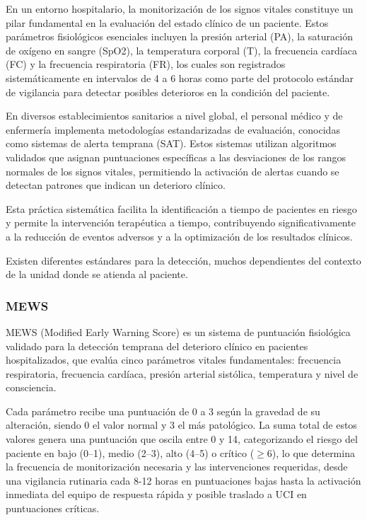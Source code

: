 En un entorno hospitalario, la monitorización de los signos vitales constituye un pilar fundamental en la evaluación del estado clínico de un paciente. 
Estos parámetros fisiológicos esenciales incluyen la presión arterial (PA), la saturación de oxígeno en sangre (SpO2), la temperatura corporal (T), 
la frecuencia cardíaca (FC) y la frecuencia respiratoria (FR), los cuales son registrados sistemáticamente en intervalos de 4 a 6 horas 
como parte del protocolo estándar de vigilancia para detectar posibles deterioros en la condición del paciente.\newline

En diversos establecimientos sanitarios a nivel global, el personal médico y de enfermería implementa metodologías estandarizadas de evaluación, 
conocidas como sistemas de alerta temprana (SAT). 
Estos sistemas utilizan algoritmos validados que asignan puntuaciones específicas a las desviaciones de los rangos normales de los signos vitales, 
permitiendo la activación de alertas cuando se detectan patrones que indican un deterioro clínico. \newline

Esta práctica sistemática facilita la identificación a tiempo de pacientes en riesgo y permite la intervención terapéutica a tiempo, 
contribuyendo significativamente a la reducción de eventos adversos y a la optimización de los resultados clínicos.\newline

Existen diferentes estándares para la detección, muchos dependientes del contexto de la unidad donde se atienda al paciente. \parencite{rpm_pm}

\newpage

\subsubsection{MEWS}
MEWS (Modified Early Warning Score) es un sistema de puntuación fisiológica validado para la detección temprana del deterioro clínico en pacientes hospitalizados, 
que evalúa cinco parámetros vitales fundamentales: frecuencia respiratoria, frecuencia cardíaca, presión arterial sistólica, temperatura 
y nivel de consciencia. \newline

Cada parámetro recibe una puntuación de 0 a 3 según la gravedad de su alteración, siendo 0 el valor normal y 3 el más patológico. 
La suma total de estos valores genera una puntuación que oscila entre 0 y 14, categorizando el riesgo del paciente en bajo (0--1), medio (2--3), alto (4--5) o crítico ($\geq$6), 
lo que determina la frecuencia de monitorización necesaria y las intervenciones requeridas, 
desde una vigilancia rutinaria cada 8-12 horas en puntuaciones bajas hasta la activación inmediata del equipo de respuesta rápida y posible traslado a UCI en puntuaciones críticas.

